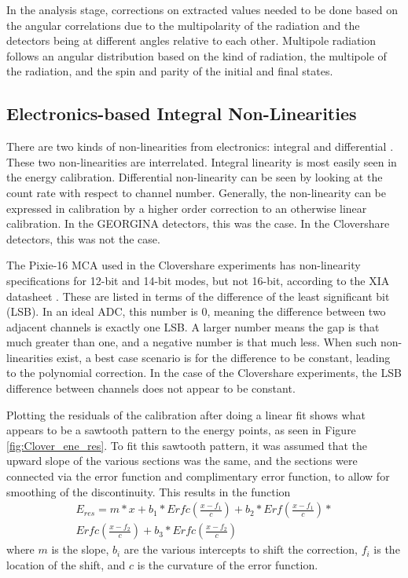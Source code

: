 In the analysis stage, corrections on extracted values needed to be done based on the angular correlations due to the multipolarity of the radiation and the detectors being at different angles relative to each other. Multipole radiation follows an angular distribution based on the kind of radiation, the multipole of the radiation, and the spin and parity of the initial and final states.

\subsection{Electronics-based Integral Non-Linearities}
\label{sec:non-linearity}

There are two kinds of non-linearities from electronics: integral and differential \citep{knoll00:rad_det_meas}. These two non-linearities are interrelated. Integral linearity is most easily seen in the energy calibration. Differential non-linearity can be seen by looking at the count rate with respect to channel number. Generally, the non-linearity can be expressed in calibration by a higher order correction to an otherwise linear calibration. In the GEORGINA detectors, this was the case. In the Clovershare detectors, this was not the case. 

The Pixie-16 MCA used in the Clovershare experiments has non-linearity specifications for 12-bit and 14-bit modes, but not 16-bit, according to the XIA datasheet \citep{xia:_pixie}. These are listed in terms of the difference of the least significant bit (LSB). In an ideal ADC, this number is 0, meaning the difference between two adjacent channels is exactly one LSB. A larger number means the gap is that much greater than one, and a negative number is that much less. When such non-linearities exist, a best case scenario is for the difference to be constant, leading to the polynomial correction. In the case of the Clovershare experiments, the LSB difference between channels does not appear to be constant.

Plotting the residuals of the calibration after doing a linear fit shows what appears to be a sawtooth pattern to the energy points, as seen in Figure \ref{fig:Clover_ene_res}. To fit this sawtooth pattern, it was assumed that the upward slope of the various sections was the same, and the sections were connected via the error function and complimentary error function, to allow for smoothing of the discontinuity. This results in the function
\begin{equation}
    \begin{aligned}
    	E_{res}= m*x+b_1*Erfc\left(\frac{x-f_1}{c}\right)+b_2*Erf\left(\frac{x-f_1}{c}\right)*\\Erfc\left(\frac{x-f_2}{c}\right)+b_3*Erfc\left(\frac{x-f_2}{c}\right)
    \end{aligned}
\end{equation}
where $m$ is the slope, $b_i$ are the various intercepts to shift the correction, $f_i$ is the location of the shift, and $c$ is the curvature of the error function.

